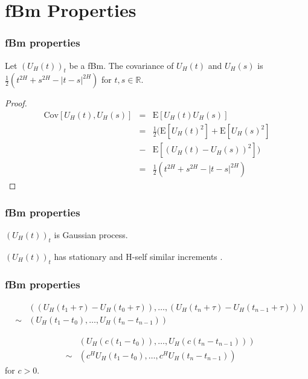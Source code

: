 \documentclass[]{beamer}
\begin{document}
\section{fBm Properties}
\begin{frame}
  \frametitle{fBm properties}
  \begin{theorem}
  Let  $(U_H(t))_{t}$ be a fBm. The covariance of $U_H(t)$ and $U_H(s)$ is $ \frac{1}{2}(t^{2H} + s^{2H} - |t-s|^{2H})$ for $t, s \in \mathbb{R}$.
\end{theorem}

\vspace{1ex}
\pause

\begin{proof}
  \begin{eqnarray*}
	\mathrm{Cov}[U_H(t), U_H(s)] &=& \mathrm{E}[U_H(t)U_H(s)] \nonumber\\
	&=& \frac{1}{2}(\mathrm{E}[U_H(t)^2] + \mathrm{E}[U_H(s)^2] \nonumber\\
	&-& \mathrm{E}[(U_H(t) - U_H(s))^2]) \nonumber\\
	&=& \frac{1}{2}(t^{2H} + s^{2H} - |t-s|^{2H})
  \end{eqnarray*}
\end{proof}
\end{frame}

\begin{frame}
  \frametitle{fBm properties}
 \begin{theorem}
  $(U_H(t))_{t}$ is Gaussian process.
\end{theorem}
\begin{theorem}
   $(U_H(t))_{t}$ has stationary and H-self similar increments .
\end{theorem} 
\end{frame}


\begin{frame}
  \frametitle{fBm properties}
  \begin{theorem}
	\begin{eqnarray*}
	  &&((U_H(t_1 + \tau) - U_H(t_0 + \tau)),\dots, (U_H(t_n + \tau) - U_H(t_{n-1} + \tau))) \\
	  &\sim&  (U_H(t_1 - t_0),\dots,U_H(t_n-t_{n-1}))
	\end{eqnarray*}
  \end{theorem}
  \begin{theorem}
\begin{eqnarray*}
  &&(U_H(c(t_1 - t_0)),\dots, U_H(c(t_n-t_{n-1}))) \\
  &\sim& (c^H U_H(t_1 - t_0),\dots, c^H U_H(t_n - t_{n-1}))
\end{eqnarray*}
for $c>0$.
  \end{theorem}
\end{frame}
\end{document}
